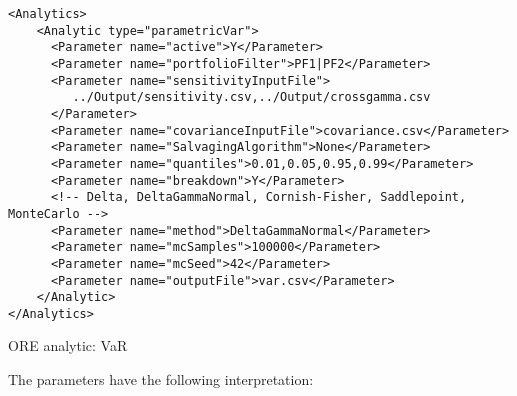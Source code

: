 {\begin{listing}[H]
\begin{verbatim}
<Analytics>
    <Analytic type="parametricVar"> 
      <Parameter name="active">Y</Parameter> 
      <Parameter name="portfolioFilter">PF1|PF2</Parameter>
      <Parameter name="sensitivityInputFile">
         ../Output/sensitivity.csv,../Output/crossgamma.csv
      </Parameter> 
      <Parameter name="covarianceInputFile">covariance.csv</Parameter> 
      <Parameter name="SalvagingAlgorithm">None</Parameter>
      <Parameter name="quantiles">0.01,0.05,0.95,0.99</Parameter> 
      <Parameter name="breakdown">Y</Parameter> 
      <!-- Delta, DeltaGammaNormal, Cornish-Fisher, Saddlepoint, MonteCarlo -->
      <Parameter name="method">DeltaGammaNormal</Parameter> 
      <Parameter name="mcSamples">100000</Parameter> 
      <Parameter name="mcSeed">42</Parameter> 
      <Parameter name="outputFile">var.csv</Parameter> 
    </Analytic> 
</Analytics>
\end{verbatim}
\caption{ORE analytic: VaR}
\label{lst:ore_var}
\end{listing}

The parameters have the following interpretation:

}
